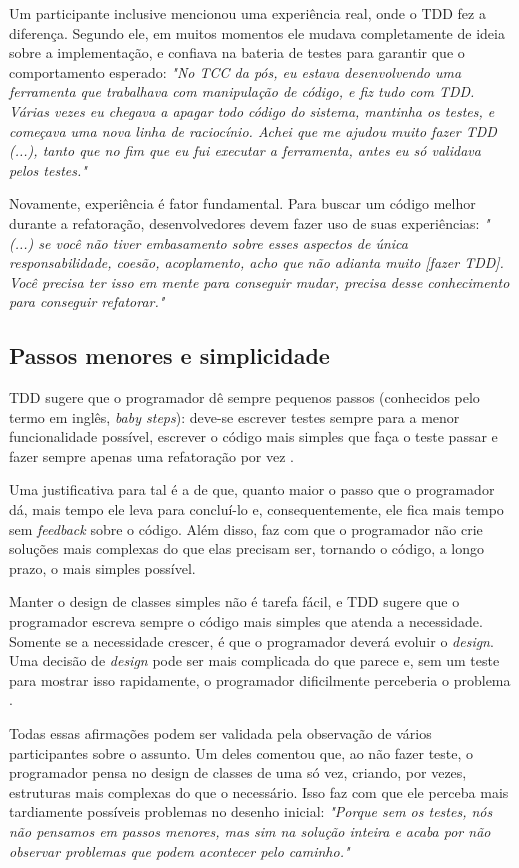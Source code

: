 Um participante inclusive mencionou uma experiência real, onde o TDD fez a diferença. Segundo ele,
em muitos momentos ele mudava completamente de ideia sobre a implementação, e confiava na bateria
de testes para garantir que o comportamento esperado:
\textit{"No TCC da pós, eu estava desenvolvendo uma ferramenta que trabalhava com manipulação de código, e fiz
tudo com TDD. Várias vezes eu chegava a apagar todo código do sistema, mantinha os testes, e começava uma nova
linha de raciocínio. Achei que me ajudou muito fazer TDD (...), tanto que no fim que eu fui executar a ferramenta,
antes eu só validava pelos testes."}

Novamente, experiência é fator fundamental. Para buscar um código melhor durante a refatoração,
desenvolvedores devem fazer uso de suas experiências:
\textit{"(...) se você não tiver embasamento sobre esses aspectos de única responsabilidade,
coesão, acoplamento, acho que não adianta muito [fazer TDD]. Você precisa ter isso em mente
para conseguir mudar, precisa desse conhecimento para conseguir refatorar."}

\subsection{Passos menores e simplicidade}

TDD sugere que o programador dê sempre pequenos passos (conhecidos pelo termo em
inglês, \textit{baby steps}): deve-se escrever testes sempre para a menor
funcionalidade possível, escrever o código mais simples que faça o teste passar
e fazer sempre apenas uma refatoração por vez \cite{TDDByExample}.

Uma justificativa para tal é a de que, quanto maior o passo que o programador dá, mais
tempo ele leva para concluí-lo e, consequentemente, ele fica mais tempo
sem \textit{feedback} sobre o código. Além disso, faz com que o programador não crie
soluções mais complexas do que elas precisam ser, tornando o código, a longo
prazo, o mais simples possível.

Manter o design de classes simples não é tarefa fácil, e TDD sugere que o programador
escreva sempre o código mais simples que atenda a necessidade. Somente se a
necessidade crescer, é que o programador deverá evoluir o \textit{design}. Uma decisão de
\textit{design} pode ser mais complicada do que parece e, sem um teste para mostrar isso
rapidamente, o programador dificilmente perceberia o problema \cite{aim-fire}.

Todas essas afirmações podem ser validada pela observação de vários participantes sobre o assunto.
Um deles comentou que,
ao não fazer teste, o programador pensa no design de classes de uma só vez, criando, por vezes,
estruturas mais complexas do que o necessário. Isso faz com que ele perceba mais tardiamente
possíveis problemas no desenho inicial:
\textit{"Porque sem os testes, nós não pensamos em passos menores, mas sim na solução inteira
e acaba por não observar problemas que podem acontecer pelo caminho."}

